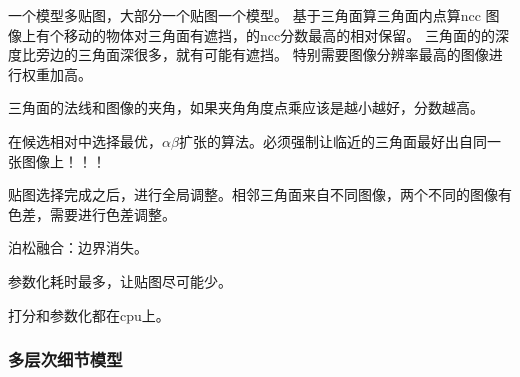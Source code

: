 一个模型多贴图，大部分一个贴图一个模型。
基于三角面算三角面内点算ncc
图像上有个移动的物体对三角面有遮挡，的ncc分数最高的相对保留。
三角面的的深度比旁边的三角面深很多，就有可能有遮挡。
特别需要图像分辨率最高的图像进行权重加高。

三角面的法线和图像的夹角，如果夹角角度点乘应该是越小越好，分数越高。

在候选相对中选择最优，$\alpha \beta$扩张的算法。必须强制让临近的三角面最好出自同一张图像上！！！ 

贴图选择完成之后，进行全局调整。相邻三角面来自不同图像，两个不同的图像有色差，需要进行色差调整。

泊松融合：边界消失。

参数化耗时最多，让贴图尽可能少。

打分和参数化都在cpu上。

\subsubsection{多层次细节模型}